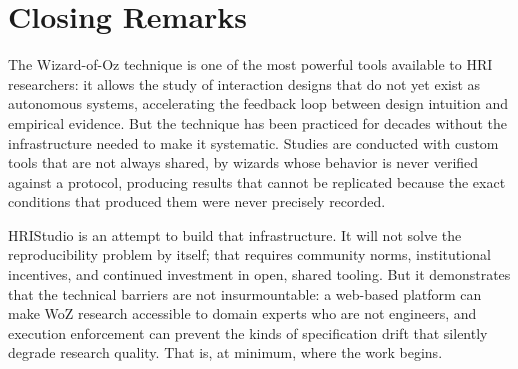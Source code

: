 \section{Closing Remarks}

The Wizard-of-Oz technique is one of the most powerful tools available to HRI researchers: it allows the study of interaction designs that do not yet exist as autonomous systems, accelerating the feedback loop between design intuition and empirical evidence. But the technique has been practiced for decades without the infrastructure needed to make it systematic. Studies are conducted with custom tools that are not always shared, by wizards whose behavior is never verified against a protocol, producing results that cannot be replicated because the exact conditions that produced them were never precisely recorded.

HRIStudio is an attempt to build that infrastructure. It will not solve the reproducibility problem by itself; that requires community norms, institutional incentives, and continued investment in open, shared tooling. But it demonstrates that the technical barriers are not insurmountable: a web-based platform can make WoZ research accessible to domain experts who are not engineers, and execution enforcement can prevent the kinds of specification drift that silently degrade research quality. That is, at minimum, where the work begins.
